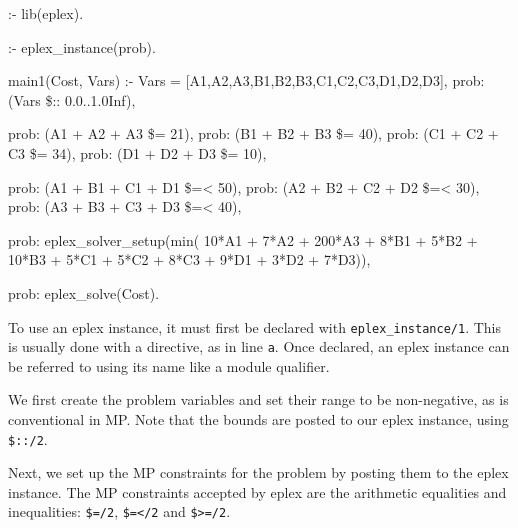 {\small
\begin{code}
:- lib(eplex).

:- eplex_instance(prob).  %

main1(Cost, Vars) :-
        Vars = [A1,A2,A3,B1,B2,B3,C1,C2,C3,D1,D2,D3], 
        prob: (Vars \$:: 0.0..1.0Inf),

        prob: (A1 + A2 + A3 \$= 21),
        prob: (B1 + B2 + B3 \$= 40),
        prob: (C1 + C2 + C3 \$= 34),
        prob: (D1 + D2 + D3 \$= 10),

        prob: (A1 + B1 + C1 + D1 \$=< 50),
        prob: (A2 + B2 + C2 + D2 \$=< 30),
        prob: (A3 + B3 + C3 + D3 \$=< 40),

        prob: eplex_solver_setup(min(
                10*A1 + 7*A2 + 200*A3 + 
                 8*B1 + 5*B2 + 10*B3 +
                 5*C1 + 5*C2 +  8*C3 + 
                 9*D1 + 3*D2 +  7*D3)),


        prob: eplex_solve(Cost).  %

\end{code}
}

To use an eplex instance, it must first be declared with \verb'eplex_instance/1'. 
This is usually done with a directive, as in line \verb'a'.
Once
declared, an eplex instance can be referred to using its name like a module
qualifier.

We first create the problem
variables and set their range to be non-negative, as is conventional in MP.
Note that the bounds are posted to our eplex instance, using \verb'$::/2'.

Next, we set up the MP constraints for the
problem by posting them to the eplex instance. 
The MP constraints accepted by eplex are the arithmetic equalities and 
inequalities:
\verb'$=/2', \verb'$=</2' and \verb'$>=/2'.

